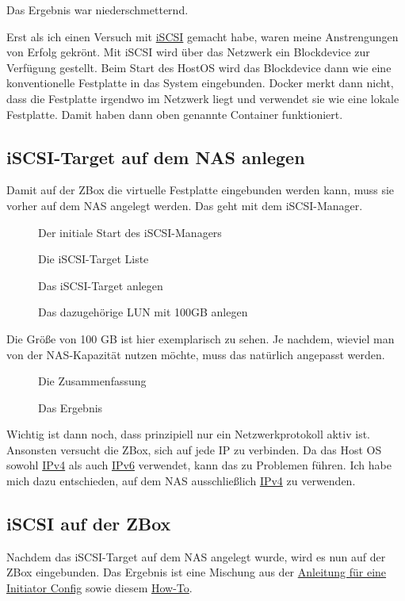 \documentclass[12pt,a4paper]{article}
\newcommand{\jpaimg}[2]{\begin{figure}[H]\centering\fbox{\texttt{[image: \#1]}}\caption{#2}\label{fig:#2}\end{figure}}
\begin{document}
Das Ergebnis war niederschmetternd.

Erst als ich einen Versuch mit \href{https://de.wikipedia.org/wiki/ISCSI}{iSCSI} gemacht habe, waren meine Anstrengungen
von Erfolg gekrönt. Mit iSCSI wird über das Netzwerk ein Block\-device zur Verfügung gestellt. Beim Start des HostOS
wird das Blockdevice dann wie eine konventionelle Festplatte in das System eingebunden. Docker merkt dann nicht, dass
die Festplatte irgendwo im Netzwerk liegt und verwendet sie wie eine lokale Festplatte. Damit haben dann oben genannte
Container funktioniert.

\subsection{iSCSI-Target auf dem NAS anlegen}
Damit auf der ZBox die virtuelle Festplatte eingebunden werden kann, muss sie vorher auf dem NAS angelegt werden. Das
geht mit dem iSCSI-Manager.

\jpaimg{./images/DSM-ISCSI-01.png}{Der initiale Start des iSCSI-Managers}

\jpaimg{./images/DSM-ISCSI-02.png}{Die iSCSI-Target Liste}

\jpaimg{./images/DSM-ISCSI-03.png}{Das iSCSI-Target anlegen}

\jpaimg{./images/DSM-ISCSI-04.png}{Das dazugehörige LUN mit 100GB anlegen}

Die Größe von 100 GB ist hier exemplarisch zu sehen. Je nachdem, wieviel man von der NAS-Kapazität nutzen möchte, muss
das natürlich angepasst werden.

\jpaimg{./images/DSM-ISCSI-05.png}{Die Zusammenfassung}

\jpaimg{./images/DSM-ISCSI-06.png}{Das Ergebnis}

Wichtig ist dann noch, dass prinzipiell nur ein Netzwerkprotokoll aktiv ist. Ansonsten versucht die ZBox, sich auf jede
IP zu verbinden. Da das Host OS sowohl \href{https://de.wikipedia.org/wiki/IPv4}{IPv4} als auch \href{https://de.wikipedia.org/wiki/IPv6}{IPv6}
verwendet, kann das zu Problemen führen. Ich habe mich dazu entschieden, auf dem NAS ausschließlich \href{https://de.wikipedia.org/wiki/IPv4}{IPv4}
zu verwenden.

\subsection{iSCSI auf der ZBox}
Nachdem das iSCSI-Target auf dem NAS angelegt wurde, wird es nun auf der ZBox eingebunden. Das Ergebnis ist eine Mischung
aus der \href{https://wiki.alpinelinux.org/wiki/ISCSI_Raid_and_Clustered_File_Systems}{Anleitung für eine Initiator Config}
sowie diesem \href{https://kifarunix.com/how-to-install-and-configure-iscsi-storage-server-on-ubuntu-18-04/}{How-To}.
\end{document}

